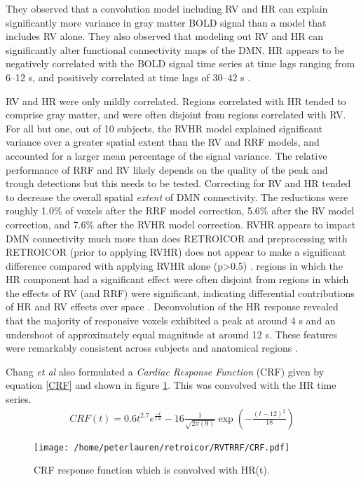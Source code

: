 \documentclass[twoside,twocolumn]{article}
\begin{document}
 They observed that a convolution model including RV and HR can explain signiﬁcantly more variance in gray matter BOLD signal than a model that includes RV alone.  They also observed that modeling out RV and HR can signiﬁcantly alter functional connectivity maps of the DMN.  HR appears to be negatively correlated with the BOLD signal time series at time lags ranging from 6–12 s, and positively correlated at time lags of 30–42 s \cite{Shmueli2007}.
 
 RV and HR were only mildly correlated.  Regions correlated with HR tended to comprise gray matter, and were often disjoint from regions correlated with RV.  For all but one, out of 10 subjects, the RVHR model explained signiﬁcant variance over a greater spatial extent than the RV and RRF models, and accounted for a larger mean percentage of the signal variance.  The relative performance of RRF and RV likely depends on the quality of the peak and trough detections but this needs to be tested.  Correcting for RV and HR tended to decrease the overall spatial {\em extent} of DMN connectivity.  The reductions were roughly 1.0\% of voxels after the RRF model correction, 5.6\% after the RV model correction, and 7.6\% after the RVHR model correction.  RVHR appears to impact DMN connectivity much more than does RETROICOR and preprocessing with RETROICOR (prior to applying RVHR) does not appear to make a significant difference compared with applying RVHR alone (p>0.5) \cite{Chang2009b}.  regions in which the HR component had a signiﬁcant effect were often disjoint from regions in which the effects of RV (and RRF) were signiﬁcant, indicating differential contributions of HR and RV effects over space \cite{Chang2009b}.  Deconvolution of the HR response revealed that the majority of responsive voxels exhibited a peak at around 4 s and an undershoot of approximately equal magnitude at around 12 s. These features were remarkably consistent across subjects and anatomical regions \cite{Chang2009b}.
 
 Chang {\em et al}\cite{Chang2009b} also formulated a {\em Cardiac Response Function} (CRF) given by equation \ref{CRF} and shown in figure \ref{fig:CRF}.  This was convolved with the HR time series.
\begin{eqnarray}
	CRF(t)=0.6t^{2.7}e^{\frac{-t}{1.6}}-16\frac{1}{\sqrt{2\pi(9)}}\exp\left(-\frac{(t-12)^2}{18}\right)
	\label{CRF}
\end{eqnarray}

\begin{figure}[htb]
	\begin{center}
		\texttt{[image: /home/peterlauren/retroicor/RVTRRF/CRF.pdf]}
		\caption{CRF response function which is convolved with HR(t).}
		\label{fig:CRF}
	\end{center}
\end{figure}
\end{document}

